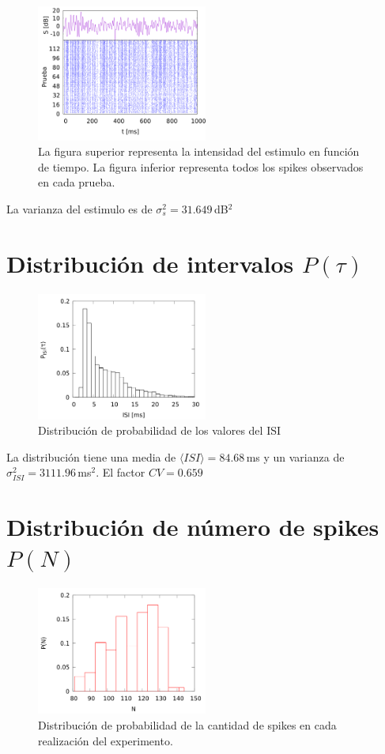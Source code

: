 \begin{figure}[H]
	\centering
	\includegraphics[width=0.5\textwidth]{../Graficos/stimulus.png}
	\caption{La figura superior representa la intensidad del estimulo en función de tiempo. La figura inferior representa todos los spikes observados en cada prueba.}
\end{figure}


La varianza del estimulo es de $\sigma^2_{s}= 31.649\,$dB$^2$
\section*{Distribución de intervalos \texorpdfstring{$P(\tau)$}{}}

\begin{figure}[H]
	\centering
	\includegraphics[width=0.5\textwidth]{../Graficos/p_isi.png}
	\caption{Distribución de probabilidad de los valores del ISI}
	\end{figure}


La distribución tiene una media de $\langle ISI \rangle = 84.68\,$ms y un varianza de $\sigma^2_{ISI}=3111.96\,$ms$^2$.
El factor $CV=0.659$


\section*{Distribución de número de spikes \texorpdfstring{$P(N)$}{}}

\begin{figure}[H]
	\centering
	\includegraphics[width=0.5\textwidth]{../Graficos/p_N.png}
	\caption{Distribución de probabilidad de la cantidad de spikes en cada realización del experimento.}
\end{figure}


